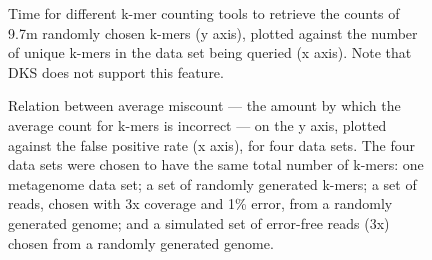 \documentclass{article}
\begin{document}
\begin{figure}
\caption{Time for different k-mer counting tools to retrieve the counts of 9.7m randomly chosen k-mers (y axis), plotted against the number of unique k-mers in the data set being queried (x axis).  Note that DKS does not support this feature.}
\label{cmp_count}
\end{figure}

\begin{figure}
\caption{Relation between average miscount --- the amount by which
the average count for k-mers is incorrect --- on the y axis, plotted against
the false positive rate (x axis), for four data sets.  The four data
sets were chosen to have the same total number of k-mers: one
metagenome data set; a set of randomly generated k-mers; a set
of reads, chosen with 3x coverage and 1\% error, from a randomly generated
genome; and a simulated set of error-free reads (3x) chosen from a randomly
generated genome.}
\label{average_offset_vs_fpr}
\end{figure}
\end{document}
